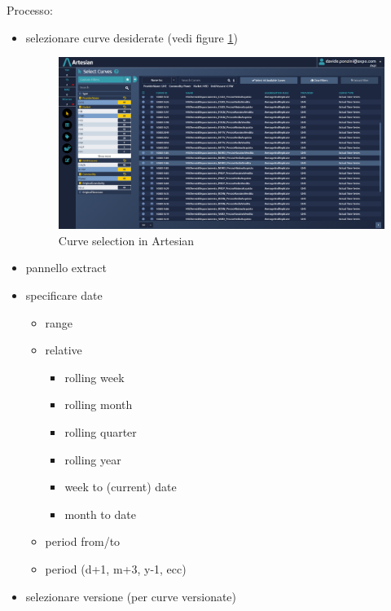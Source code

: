     Processo:
    \begin{itemize}
        \item selezionare curve desiderate (vedi figure \ref{fig:artesian:select_curves})
            \begin{figure}
                \centering
                \includegraphics[width=\textwidth]{res/artesian/select_curves.png}
                \caption{Curve selection in Artesian}
                \label{fig:artesian:select_curves}
            \end{figure}
        \item pannello extract
        \item specificare date
            \begin{itemize}
                \item range
                \item relative
                    \begin{itemize}
                        \item rolling week
                        \item rolling month
                        \item rolling quarter
                        \item rolling year
                        \item week to (current) date
                        \item month to date
                    \end{itemize}
                \item period from/to
                \item period (d+1, m+3, y-1, ecc)
            \end{itemize}
        \item selezionare versione (per curve versionate)
            \begin{itemize}

\end{itemize}
\end{itemize}
